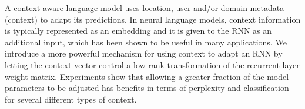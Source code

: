 A context-aware language model uses location, user and/or domain metadata (context) to adapt its predictions. In neural language models, context information is typically represented as an embedding and it is given to the RNN as an additional input, which has been shown to be useful in many applications. We introduce a more powerful mechanism for using context to adapt an RNN by letting the context vector control a low-rank transformation of the recurrent layer weight matrix. Experiments show that allowing a greater fraction of the model parameters to be adjusted has benefits in terms of perplexity and classification for several different types of context.
